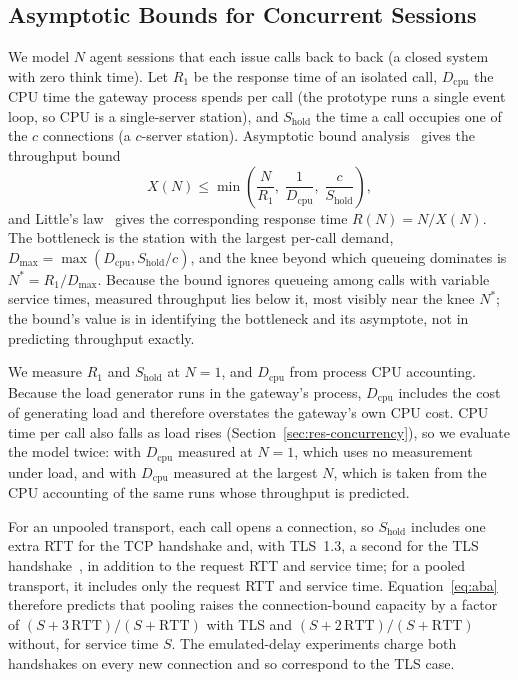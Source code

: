 \documentclass{ieeeaccess}
\begin{document}
\subsection{Asymptotic Bounds for Concurrent Sessions}
We model $N$ agent sessions that each issue calls back to back (a closed system with zero think time). Let $R_1$ be the response time of an isolated call, $D_{\mathrm{cpu}}$ the CPU time the gateway process spends per call (the prototype runs a single event loop, so CPU is a single-server station), and $S_{\mathrm{hold}}$ the time a call occupies one of the $c$ connections (a $c$-server station). Asymptotic bound analysis~\cite{lazowska1984qsp} gives the throughput bound
\begin{equation}
X(N) \le \min\!\left(\frac{N}{R_1},\; \frac{1}{D_{\mathrm{cpu}}},\; \frac{c}{S_{\mathrm{hold}}}\right),
\label{eq:aba}
\end{equation}
and Little's law~\cite{little1961proof} gives the corresponding response time $R(N) = N / X(N)$. The bottleneck is the station with the largest per-call demand, $D_{\max} = \max(D_{\mathrm{cpu}}, S_{\mathrm{hold}}/c)$, and the knee beyond which queueing dominates is $N^* = R_1 / D_{\max}$. Because the bound ignores queueing among calls with variable service times, measured throughput lies below it, most visibly near the knee $N^*$; the bound's value is in identifying the bottleneck and its asymptote, not in predicting throughput exactly.

We measure $R_1$ and $S_{\mathrm{hold}}$ at $N=1$, and $D_{\mathrm{cpu}}$ from process CPU accounting. Because the load generator runs in the gateway's process, $D_{\mathrm{cpu}}$ includes the cost of generating load and therefore overstates the gateway's own CPU cost. CPU time per call also falls as load rises (Section~\ref{sec:res-concurrency}), so we evaluate the model twice: with $D_{\mathrm{cpu}}$ measured at $N=1$, which uses no measurement under load, and with $D_{\mathrm{cpu}}$ measured at the largest $N$, which is taken from the CPU accounting of the same runs whose throughput is predicted.

For an unpooled transport, each call opens a connection, so $S_{\mathrm{hold}}$ includes one extra RTT for the TCP handshake and, with TLS~1.3, a second for the TLS handshake~\cite{rfc8446}, in addition to the request RTT and service time; for a pooled transport, it includes only the request RTT and service time. Equation~\eqref{eq:aba} therefore predicts that pooling raises the connection-bound capacity by a factor of $(S + 3\,\mathrm{RTT})/(S + \mathrm{RTT})$ with TLS and $(S + 2\,\mathrm{RTT})/(S + \mathrm{RTT})$ without, for service time $S$. The emulated-delay experiments charge both handshakes on every new connection and so correspond to the TLS case.
\end{document}
